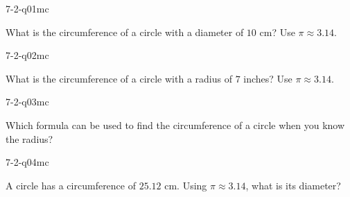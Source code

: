 

\begin{practiceQuestion}{7-2-q01}{mc}
\begin{questionText}
What is the circumference of a circle with a diameter of $10$ cm? Use $\pi \approx 3.14$.
\end{questionText}
\end{practiceQuestion}

\begin{practiceQuestion}{7-2-q02}{mc}
\begin{questionText}
What is the circumference of a circle with a radius of $7$ inches? Use $\pi \approx 3.14$.
\end{questionText}
\end{practiceQuestion}

\begin{practiceQuestion}{7-2-q03}{mc}
\begin{questionText}
Which formula can be used to find the circumference of a circle when you know the radius?
\end{questionText}
\end{practiceQuestion}

\begin{practiceQuestion}{7-2-q04}{mc}
\begin{questionText}
A circle has a circumference of $25.12$ cm. Using $\pi \approx 3.14$, what is its diameter?
\end{questionText}
\end{practiceQuestion}

